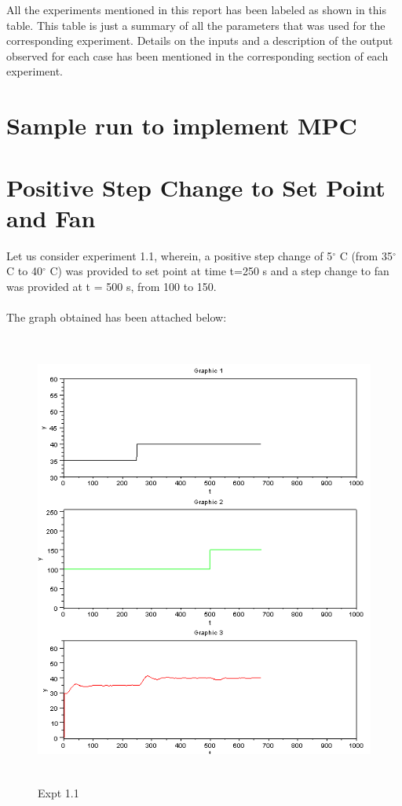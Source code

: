 All the experiments mentioned in this report has been labeled as shown in this table. This table is just a summary of all the parameters that was used for the corresponding experiment. Details on the inputs and a description of the output observed for each case has been mentioned in the corresponding section of each experiment.

\section{Sample run to implement MPC}
\section{Positive Step Change to Set Point and Fan}
Let us consider experiment 1.1, wherein, a positive step change of 5$^\circ$ C (from 35$^\circ$ C to 40$^\circ$ C) was provided to set point at time t=250 s and a step change to fan was provided at t = 500 s, from 100 to 150. \\ \\
The graph obtained has been attached below:\\
\begin{figure}[H]
  \includegraphics[width=12cm, height=15cm]{mpc/1_1.png}
  \caption{Expt 1.1}
\end{figure}
